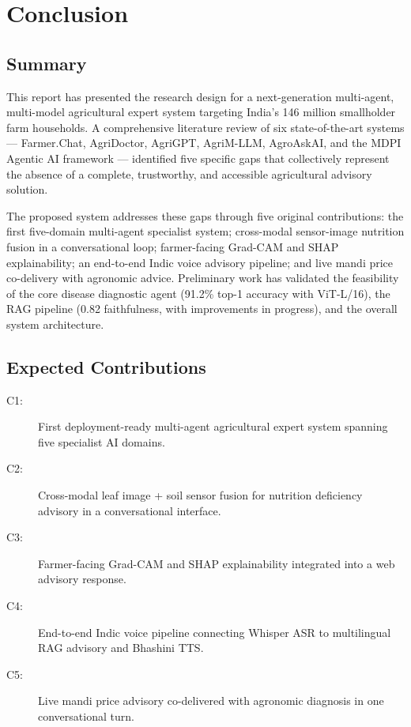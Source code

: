 \documentclass[12pt,a4paper]{article}
\begin{document}
\newpage
\section{Conclusion}

\subsection{Summary}
This report has presented the research design for a next-generation multi-agent, multi-model agricultural expert system targeting India's 146 million smallholder farm households. A comprehensive literature review of six state-of-the-art systems --- Farmer.\allowbreak Chat, AgriDoctor, AgriGPT, AgriM-LLM, AgroAskAI, and the MDPI Agentic AI framework --- identified five specific gaps that collectively represent the absence of a complete, trustworthy, and accessible agricultural advisory solution.

The proposed system addresses these gaps through five original contributions: the first five-domain multi-agent specialist system; cross-modal sensor-image nutrition fusion in a conversational loop; farmer-facing Grad-CAM and SHAP explainability; an end-to-end Indic voice advisory pipeline; and live mandi price co-delivery with agronomic advice. Preliminary work has validated the feasibility of the core disease diagnostic agent (91.2\% top-1 accuracy with ViT-L/16), the RAG pipeline (0.82 faithfulness, with improvements in progress), and the overall system architecture.

\subsection{Expected Contributions}
\begin{description}
    \item[C1:] First deployment-ready multi-agent agricultural expert system spanning five specialist AI domains.
    \item[C2:] Cross-modal leaf image + soil sensor fusion for nutrition deficiency advisory in a conversational interface.
    \item[C3:] Farmer-facing Grad-CAM and SHAP explainability integrated into a web advisory response.
    \item[C4:] End-to-end Indic voice pipeline connecting Whisper ASR to multilingual RAG advisory and Bhashini TTS.
    \item[C5:] Live mandi price advisory co-delivered with agronomic diagnosis in one conversational turn.
\end{description}


\clearpage


\end{document}
